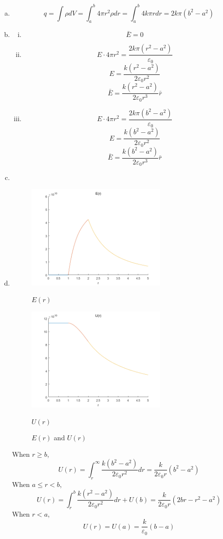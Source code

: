 \documentclass{article}
\begin{document}
\section{}
\begin{enumerate}[(a)]
\item
$$q=\int\rho dV=\int_a^b4\pi r^2\rho dr=\int_a^b4k\pi rdr=2k\pi(b^2-a^2)$$
\item
\begin{enumerate}[(i)]
\item
$$\bar{E}=0$$
\item
$$E\cdot4\pi r^2=\frac{2k\pi(r^2-a^2)}{\varepsilon_0}$$
$$E=\frac{k(r^2-a^2)}{2\varepsilon_0r^2}$$
$$\bar{E}=\frac{k(r^2-a^2)}{2\varepsilon_0r^3}\bar{r}$$
\item
$$E\cdot4\pi r^2=\frac{2k\pi(b^2-a^2)}{\varepsilon_0}$$
$$E=\frac{k(b^2-a^2)}{2\varepsilon_0r^2}$$
$$\bar{E}=\frac{k(b^2-a^2)}{2\varepsilon_0r^3}\bar{r}$$
\end{enumerate}
\item
\item
\begin{figure}[h!]
\begin{minipage}{0.48\linewidth}
  \centerline{\includegraphics[width=7.0cm]{p2.png}}
  \centerline{$E(r)$}
\end{minipage}
\hfill
\begin{minipage}{.48\linewidth}
  \centerline{\includegraphics[width=7.0cm]{p2_2.png}}
  \centerline{$U(r)$}
\end{minipage}
\caption{$E(r)$ and $U(r)$}
\label{fig-5}
\end{figure}

When $r\geqslant b$,
$$U(r)=\int_r^{\infty}\frac{k(b^2-a^2)}{2\varepsilon_0r^2}dr=\frac{k}{2\varepsilon_0r}(b^2-a^2)$$
When $a\leqslant r<b$,
$$U(r)=\int_r^b\frac{k(r^2-a^2)}{2\varepsilon_0r^2}dr+U(b)=\frac{k}{2\varepsilon_0r}(2br-r^2-a^2)$$
When $r<a$,
$$U(r)=U(a)=\frac{k}{\varepsilon_0}(b-a)$$
\end{enumerate}
\end{document}
